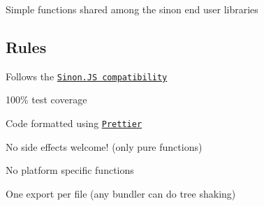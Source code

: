 \href{http://travis-ci.org/sinonjs/commons}{\tt } \href{https://coveralls.io/github/sinonjs/commons?branch=master}{\tt }

Simple functions shared among the sinon end user libraries

\subsection*{Rules}


\begin{DoxyItemize}
\item Follows the \href{https://github.com/sinonjs/sinon/blob/master/CONTRIBUTING.md#compatibility}{\tt Sinon.\+JS compatibility}
\item 100\% test coverage
\item Code formatted using \href{https://prettier.io}{\tt Prettier}
\item No side effects welcome! (only pure functions)
\item No platform specific functions
\item One export per file (any bundler can do tree shaking) 
\end{DoxyItemize}